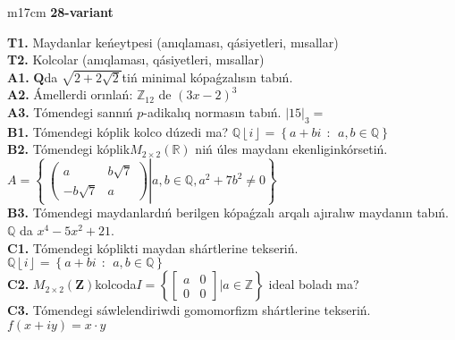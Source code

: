 \documentclass{article}
\begin{document}
\begin{tabular}{m{17cm}}
\textbf{28-variant}
\newline

\textbf{T1.} Maydanlar keńeytpesi (anıqlaması, qásiyetleri, mısallar) \\
\textbf{T2.} Kolcolar (anıqlaması, qásiyetleri, mısallar) \\
\textbf{A1.} \(\mathbf{Q}\)da \(\sqrt{2 + 2\sqrt{2}}\)tiń minimal kópaǵzalısın tabıń. \\
\textbf{A2.} Ámellerdi orınlań: \(\mathbb{Z}_{12}\) de \((3x - 2)^{3}\) \\
\textbf{A3.} Tómendegi sannıń \(p\)-adikalıq normasın tabıń. \(|15|_{3} =\) \\
\textbf{B1.} Tómendegi kóplik kolco dúzedi ma? \(\mathbb{Q}\left\lfloor i \right\rfloor = \left\{ a + bi\ \ :\ \ a,b\mathbb{\in Q} \right\}\) \\
\textbf{B2.} Tómendegi kóplik\(M_{2 \times 2}\left( \mathbb{R} \right)\) niń úles maydanı ekenliginkórsetiń. \(A = \left\{ \left. \ \begin{pmatrix}
a & b\sqrt{7} \\
 - b\sqrt{7} & a
\end{pmatrix} \right|a,b\mathbb{\in Q},a^{2} + 7b^{2} \neq 0 \right\}\) \\
\textbf{B3.} Tómendegi maydanlardıń berilgen kópaǵzalı arqalı ajıralıw maydanın tabıń.
\(\mathbb{Q}\) da \(x^{4} - 5x^{2} + 21\). \\
\textbf{C1.} Tómendegi kóplikti maydan shártlerine tekseriń. \(\mathbb{Q}\left\lfloor i \right\rfloor = \left\{ a + bi\ \ :\ \ a,b\mathbb{\in Q} \right\}\) \\
\textbf{C2.} \(M_{2 \times 2}\left( \mathbf{Z} \right)\)kolcoda\(I = \left\{ \begin{bmatrix}
a & 0 \\
0 & 0
\end{bmatrix}|a\mathbb{\in Z} \right\}\) ideal boladı ma? \\
\textbf{C3.} Tómendegi sáwlelendiriwdi gomomorfizm shártlerine tekseriń. \(f(x + iy) = x \cdot y\) \\

\end{tabular}
\vspace{1cm}
\end{document}
